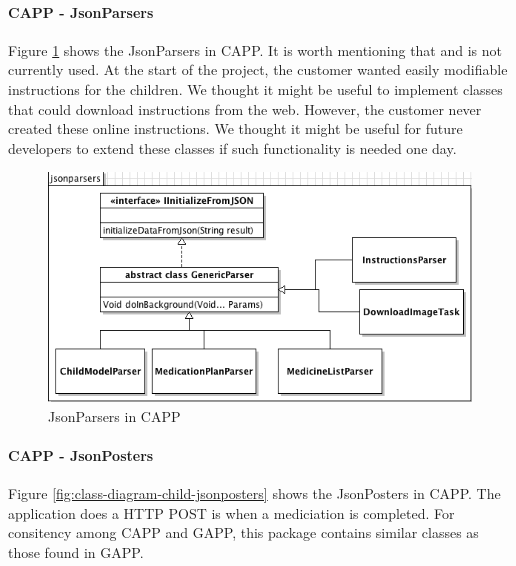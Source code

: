 \paragraph{CAPP - JsonParsers}
Figure \ref{fig:class-diagram-child-jsonparsers} shows the JsonParsers in CAPP.
It is worth mentioning that  and  is not currently used. 
At the start of the project, the customer wanted easily modifiable instructions for the children. We thought it 
might be useful to implement classes that could download instructions from the web. However, the customer never 
created these online instructions. We thought it might be useful for future developers to extend these classes
if such functionality is needed one day.   


\begin{figure}
	\centering
		\includegraphics[width = \linewidth]{Pictures/ArchPictures/capparchpictures/capp_jsonparsers.png}
	\caption{JsonParsers in CAPP}
	\label{fig:class-diagram-child-jsonparsers}
\end{figure}

\paragraph{CAPP - JsonPosters}
Figure \ref{fig:class-diagram-child-jsonposters} shows the JsonPosters in CAPP.
The application does a HTTP POST is when a mediciation is completed. For consitency among CAPP and GAPP,
this package contains similar classes as those found in GAPP. 

